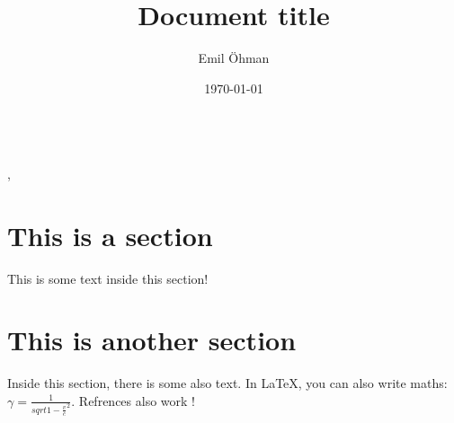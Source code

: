 \documentclass[a4paper]{article}
\title{Document title}
\author{Emil Öhman}
\date{\today}
\begin{document}
\makeatletter
\huge{\textbf{\@title}}\vspace{0.33em}\\
\Large{\@author, \@date}\normalsize
\makeatother

\tableofcontents

\section{This is a section}
This is some text inside this section!

\section{This is another section}
Inside this section, there is some also text. In \LaTeX, you can also write maths: \(\gamma=\frac{1}{sqrt{1-{\frac{v}{c}}^2}}\). Refrences also work \cite{lee2023roomtemperature}!

\printbibliography
\end{document}

